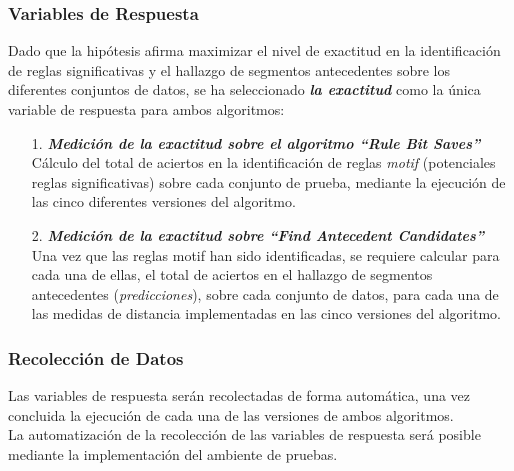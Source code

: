\subsubsection{Variables de Respuesta}
Dado que la hip\'otesis afirma maximizar el nivel de exactitud en la identificaci\'on de reglas significativas y el hallazgo de segmentos antecedentes sobre los diferentes conjuntos de datos, se ha seleccionado \textit{\textbf{la exactitud}} como la \'unica variable de respuesta para ambos algoritmos:
\begin{itemize}
\item [1.] \textbf{\textit{Medici\'on de la exactitud sobre el algoritmo \enquote{Rule Bit Saves}}}\\
C\'alculo del total de aciertos en la identificaci\'on de reglas \textit{motif} (potenciales reglas significativas) sobre cada conjunto de prueba, mediante la ejecuci\'on de las cinco diferentes versiones del algoritmo.
\item [2.] \textit{\textbf{Medici\'on de la exactitud sobre \enquote{Find Antecedent Candidates}}}\\ 
Una vez que las reglas motif han sido identificadas, se requiere calcular para cada una de ellas, el total de aciertos en el hallazgo de segmentos antecedentes (\textit{predicciones}), sobre cada conjunto de datos, para cada una de las medidas de distancia implementadas en las cinco versiones del algoritmo.
\end{itemize}
\subsubsection{Recolecci\'on de Datos}
Las variables de respuesta ser\'an recolectadas de forma autom\'atica, una vez concluida la ejecuci\'on de cada una de las versiones de ambos algoritmos.\\
La automatizaci\'on de la recolecci\'on de las variables de respuesta ser\'a posible mediante la implementaci\'on del ambiente de pruebas.
